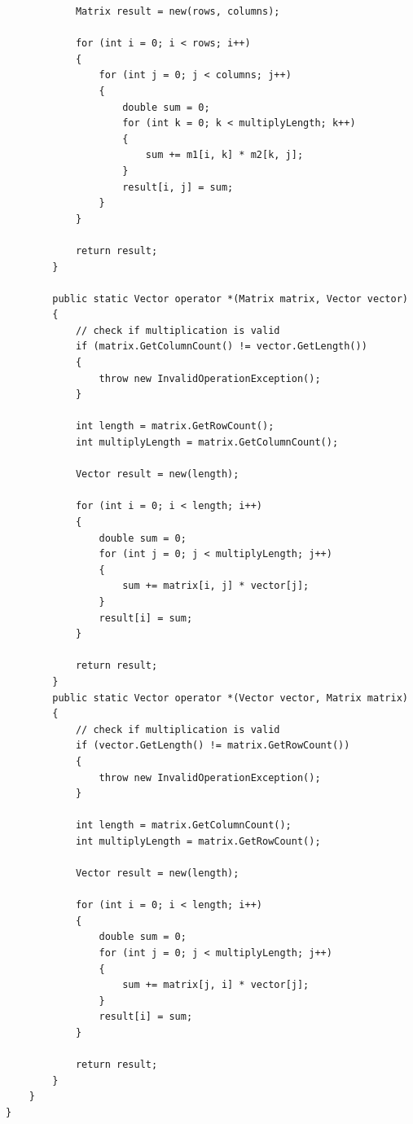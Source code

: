 \documentclass{article}
\begin{document}
\begin{verbatim}
			Matrix result = new(rows, columns);

			for (int i = 0; i < rows; i++)
			{
				for (int j = 0; j < columns; j++)
				{
					double sum = 0;
					for (int k = 0; k < multiplyLength; k++)
					{
						sum += m1[i, k] * m2[k, j];
					}
					result[i, j] = sum;
				}
			}

			return result;
		}
		
		public static Vector operator *(Matrix matrix, Vector vector)
		{
			// check if multiplication is valid
			if (matrix.GetColumnCount() != vector.GetLength())
			{
				throw new InvalidOperationException();
			}

			int length = matrix.GetRowCount();
			int multiplyLength = matrix.GetColumnCount();

			Vector result = new(length);

			for (int i = 0; i < length; i++)
			{
				double sum = 0;
				for (int j = 0; j < multiplyLength; j++)
				{
					sum += matrix[i, j] * vector[j];
				}
				result[i] = sum;
			}

			return result;
		}
		public static Vector operator *(Vector vector, Matrix matrix)
		{
			// check if multiplication is valid
			if (vector.GetLength() != matrix.GetRowCount())
			{
				throw new InvalidOperationException();
			}

			int length = matrix.GetColumnCount();
			int multiplyLength = matrix.GetRowCount();

			Vector result = new(length);

			for (int i = 0; i < length; i++)
			{
				double sum = 0;
				for (int j = 0; j < multiplyLength; j++)
				{
					sum += matrix[j, i] * vector[j];
				}
				result[i] = sum;
			}

			return result;
		}
	}
}
\end{verbatim}
\end{document}
